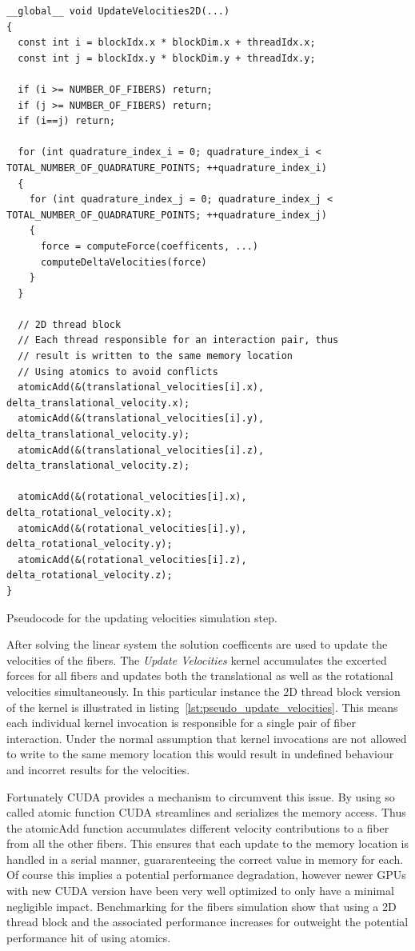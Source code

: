 \documentclass[a4paper,11pt]{kth-mag}
\begin{document}
\begin{listing}
  \centering
  \begin{verbatim}
__global__ void UpdateVelocities2D(...)
{
  const int i = blockIdx.x * blockDim.x + threadIdx.x;
  const int j = blockIdx.y * blockDim.y + threadIdx.y;

  if (i >= NUMBER_OF_FIBERS) return;
  if (j >= NUMBER_OF_FIBERS) return;
  if (i==j) return;

  for (int quadrature_index_i = 0; quadrature_index_i < TOTAL_NUMBER_OF_QUADRATURE_POINTS; ++quadrature_index_i)
  {
    for (int quadrature_index_j = 0; quadrature_index_j < TOTAL_NUMBER_OF_QUADRATURE_POINTS; ++quadrature_index_j)
    {
      force = computeForce(coefficents, ...)
      computeDeltaVelocities(force)
    }
  }

  // 2D thread block
  // Each thread responsible for an interaction pair, thus
  // result is written to the same memory location
  // Using atomics to avoid conflicts
  atomicAdd(&(translational_velocities[i].x), delta_translational_velocity.x);
  atomicAdd(&(translational_velocities[i].y), delta_translational_velocity.y);
  atomicAdd(&(translational_velocities[i].z), delta_translational_velocity.z);

  atomicAdd(&(rotational_velocities[i].x), delta_rotational_velocity.x);
  atomicAdd(&(rotational_velocities[i].y), delta_rotational_velocity.y);
  atomicAdd(&(rotational_velocities[i].z), delta_rotational_velocity.z);
}
  \end{verbatim}
  \caption{Pseudocode for the updating velocities simulation step.}
  \label{lst:pseudo_update_velocities}
\end{listing}

After solving the linear system the solution coefficents are used to update the velocities of the fibers. The \emph{Update Velocities} kernel accumulates the excerted forces for all fibers and updates both the translational as well as the rotational velocities simultaneously. In this particular instance the 2D thread block version of the kernel is illustrated in listing~\ref{lst:pseudo_update_velocities}. This means each individual kernel invocation is responsible for a single pair of fiber interaction. Under the normal assumption that kernel invocations are not allowed to write to the same memory location this would result in undefined behaviour and incorret results for the velocities.

Fortunately CUDA provides a mechanism to circumvent this issue. By using so called atomic function CUDA streamlines and serializes the memory access. Thus the atomicAdd function accumulates different velocity contributions to a fiber from all the other fibers. This ensures that each update to the memory location is handled in a serial manner, guararenteeing the correct value in memory for each. Of course this implies a potential performance degradation, however newer GPUs with new CUDA version have been very well optimized to only have a minimal negligible impact. Benchmarking for the fibers simulation show that using a 2D thread block and the associated performance increases for outweight the potential performance hit of using atomics.
\end{document}

